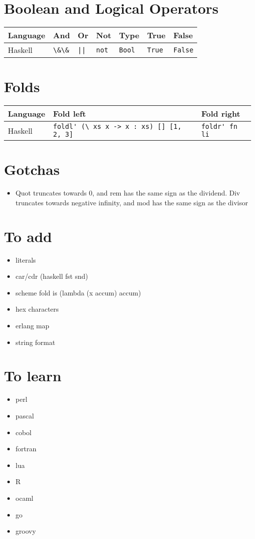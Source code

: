 \documentclass{article}
\begin{document}
\section{Boolean and Logical Operators}
\begin{longtabu} to 0.75\linewidth{ X X X  X X X X }
	Language & And & Or & Not & Type & True & False \\
	\hline
	Haskell & \lstinline$\&\&$ & \lstinline$||$ & \lstinline$not$ & \lstinline$Bool$ & \lstinline$True$ & \lstinline$False$ \\
\end{longtabu}

\section{Folds}
\begin{longtabu} to 0.75\linewidth { X X X }
	Language & Fold left & Fold right \\
	\hline
	Haskell & \lstinline$foldl' (\ xs x -> x : xs) [] [1, 2, 3]$ & \lstinline$foldr' fn li$ \\
\end{longtabu}

\section{Gotchas}
\begin{itemize}
	\item Quot truncates towards 0, and rem has the same sign as the dividend. Div truncates towards negative infinity, and mod has the same sign as the divisor
\end{itemize}

\section{To add}
\begin{itemize}
	\item literals
	\item car/cdr (haskell fst snd)
	\item scheme fold is (lambda (x accum) accum)
	\item hex characters
	\item erlang map
	\item string format
\end{itemize}

\section{To learn}
\begin{itemize}
	\item perl
	\item pascal
	\item cobol
	\item fortran
	\item lua
	\item R
	\item ocaml
	\item go
	\item groovy
\end{itemize}
\end{document}
